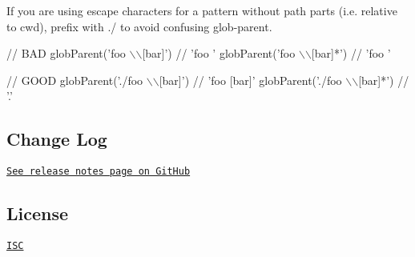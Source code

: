 If you are using escape characters for a pattern without path parts (i.\+e. relative to {\ttfamily cwd}), prefix with {\ttfamily ./} to avoid confusing glob-\/parent.


\begin{DoxyCode}
// BAD
globParent('foo \(\backslash\)\(\backslash\)[bar]') // 'foo '
globParent('foo \(\backslash\)\(\backslash\)[bar]*') // 'foo '

// GOOD
globParent('./foo \(\backslash\)\(\backslash\)[bar]') // 'foo [bar]'
globParent('./foo \(\backslash\)\(\backslash\)[bar]*') // '.'
\end{DoxyCode}


\subsection*{Change Log }

\href{https://github.com/es128/glob-parent/releases}{\tt See release notes page on Git\+Hub}

\subsection*{License }

\href{https://raw.github.com/es128/glob-parent/master/LICENSE}{\tt I\+SC} 